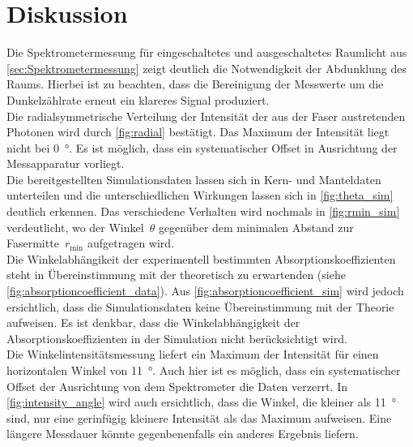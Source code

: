 \section{Diskussion}
\label{sec:Diskussion}
Die Spektrometermessung für eingeschaltetes und ausgeschaltetes Raumlicht aus \autoref{sec:Spektrometermessung} zeigt deutlich die Notwendigkeit der Abdunklung des
Raums. Hierbei ist zu beachten, dass die Bereinigung der Messwerte um die Dunkelzählrate erneut ein klareres Signal produziert. \\
Die radialsymmetrische Verteilung der Intensität der aus der Faser austretenden Photonen wird durch \autoref{fig:radial} bestätigt. Das Maximum der Intensität liegt nicht 
bei \qty{0}{\degree}. Es ist möglich, dass ein systematischer Offset in Ausrichtung der Messapparatur vorliegt. \\
Die bereitgestellten Simulationsdaten lassen sich in Kern- und Manteldaten unterteilen und die unterschiedlichen Wirkungen lassen sich in \autoref{fig:theta_sim}
deutlich erkennen.
Das verschiedene Verhalten wird nochmals in \autoref{fig:rmin_sim} verdeutlicht, wo der Winkel~$\theta$ gegenüber dem minimalen Abstand zur Fasermitte~$r_{\text{min}}$
aufgetragen wird. \\
Die Winkelabhängikeit der experimentell bestimmten Absorptionskoeffizienten steht in Übereinstimmung mit der theoretisch zu erwartenden (siehe \autoref{fig:absorptioncoefficient_data}).
Aus \autoref{fig:absorptioncoefficient_sim} wird jedoch ersichtlich, dass die Simulationsdaten keine Übereinstimmung mit der Theorie aufweisen. Es ist denkbar, dass
die Winkelabhängigkeit der Absorptionskoeffizienten in der Simulation nicht berücksichtigt wird. \\
Die Winkelintensitätsmessung liefert ein Maximum der Intensität für einen horizontalen Winkel von \qty{11}{\degree}. Auch hier ist es möglich, dass ein systematischer Offset
der Ausrichtung von dem Spektrometer die Daten verzerrt. In \autoref{fig:intensity_angle} wird auch ersichtlich, dass die Winkel, die kleiner als \qty{11}{\degree} sind,
nur eine gerinfügig kleinere Intensität als das Maximum aufweisen. Eine längere Messdauer könnte gegenbenenfalls ein anderes Ergebnis liefern.
 